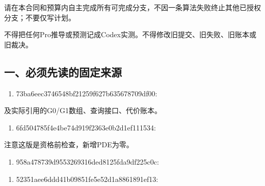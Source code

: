\documentclass[
  10pt,
  a4paper,
]{article}
\providecommand{\tightlist}{%
  \setlength{\itemsep}{0pt}\setlength{\parskip}{0pt}}
\providecommand{\tightlist}{\setlength{\itemsep}{1pt}\setlength{\parskip}{1pt}}
\begin{document}
请在本合同和预算内自主完成所有可完成分支，不因一条算法失败终止其他已授权分支；不要仅写计划。

不得把任何Pro推导或预测记成Codex实测。不得修改旧提交、旧失败、旧账本或旧裁决。

\hypertarget{ux4e00ux5fc5ux987bux5148ux8bfbux7684ux56faux5b9aux6765ux6e90}{%
\subsection{一、必须先读的固定来源}\label{ux4e00ux5fc5ux987bux5148ux8bfbux7684ux56faux5b9aux6765ux6e90}}

\begin{enumerate}
\def\labelenumi{\arabic{enumi}.}
\tightlist
\item
  73ba6eec3746548bf21259f627b635678709df00:
\end{enumerate}





及实际引用的G0/G1数组、查询接口、代价账本。

\begin{enumerate}
\def\labelenumi{\arabic{enumi}.}
\setcounter{enumi}{1}
\tightlist
\item
  6fd504785f4e4be74d919f2363e0b2d1ef111534:
\end{enumerate}


注意这版是资格前检查，新增PDE为零。

\begin{enumerate}
\def\labelenumi{\arabic{enumi}.}
\setcounter{enumi}{2}
\tightlist
\item
  958a478739d9553269316ded8125fda9df225c0c:
\end{enumerate}


\begin{enumerate}
\def\labelenumi{\arabic{enumi}.}
\setcounter{enumi}{3}
\tightlist
\item
  52351aee6ddd41b09851fe5e52d1a8861891ef13:
\end{enumerate}

\end{document}
